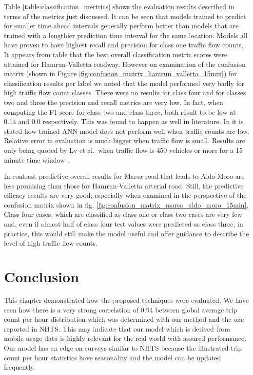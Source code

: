 \documentclass[12pt, a4paper]{report}
\theoremstyle{definition}
\theoremstyle{definition}%
\theoremstyle{definition}%
\theoremstyle{definition}%
\theoremstyle{definition}%
\theoremstyle{definition}%
\begin{document}
Table \ref{table:classification_mertrics} shows the evaluation results described in terms of the metrics just discussed. It can be seen that models trained to predict for smaller time ahead intervals generally perform better than models that are trained with a lengthier prediction time interval for the same location.  Models all have proven to have highest recall and precision for class one traffic flow counts. It appears from table that the best overall classification metric scores were attained for Hamrun-Valletta roadway. However on examination of the confusion matrix (shown in Figure \ref{fig:confusion_matrix_hamrun_valletta_15min}) for classification results per label we noted that the model performed very badly for high traffic flow count classes. There were no results for class four and for classes two and three the precision and recall metrics are very low. In fact, when computing the F1-score for class two and class three, both result to be low at 0.14 and 0.0 respectively. This was found to happen as well in literature. In \cite{lv2015traffic} it is stated how trained ANN model does not perform well when traffic counts are low. Relative error in evaluation is much bigger when traffic flow is small. Results are only being quoted by Lv et al.\ when traffic flow is 450 vehicles or more for a 15 minute time window \cite{lv2015traffic}.

In contrast predictive overall results for Marsa road that leads to Aldo Moro are less promising than those for Hamrun-Valletta arterial road. Still, the predictive efficacy results are very good, especially when examined in the perspective of the confusion matrix shown in fig. \ref{fig:confusion_matrix_marsa_aldo_moro_15min}. Class four cases, which are classified as class one or class two cases are very few and, even if almost half of class four test values were predicted as class three, in practice, this would still make the model useful and offer guidance to describe the level of high traffic flow counts.


\section{Conclusion}

This chapter demonstrated how the proposed techniques were evaluated. We have seen how there is a very strong correlation of 0.94 between global average trip count per hour  distribution which was determined with our method and the one reported in NHTS. This may indicate that our model which is derived from mobile usage data is highly relevant for the real world with assured performance. Our model has an edge on surveys similar to NHTS because the illustrated trip count per hour statistics have seasonality and the model can be updated frequently.  
\end{document}
